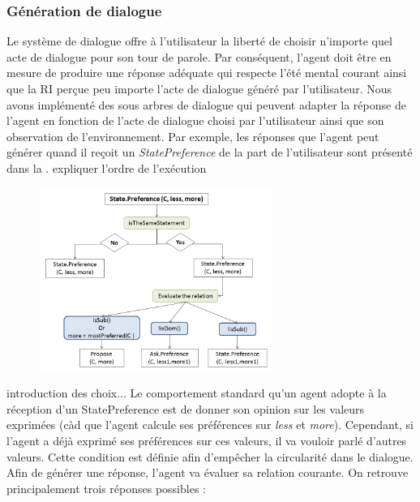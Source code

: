 \documentclass [french]{sig-alternate-05-2015}
\begin{document}
\subsubsection{Génération de dialogue} 
 \par Le système de dialogue offre à l'utilisateur la liberté de choisir n'importe quel acte de dialogue pour son tour de parole. Par conséquent, l'agent doit être en mesure de produire une réponse adéquate qui respecte l'été mental courant ainsi que la RI perçue peu importe l'acte de dialogue généré par l'utilisateur. Nous avons implémenté des sous arbres de dialogue qui peuvent adapter la réponse de l'agent en fonction de  l'acte de dialogue choisi par l'utilisateur ainsi que son observation de l'environnement. Par exemple, les réponses que l'agent peut générer quand il reçoit un \emph{StatePreference} de la part de l'utilisateur sont présenté dans la .
 {\color{red} expliquer l'ordre de l'exécution}
 \begin{figure} [h]
 	\centerline{\includegraphics[width=3in]{figs/statePref_v2.png}}
	\vskip 8pt
 \end{figure}
\par {\color{red} introduction des choix...} 
Le comportement standard qu'un agent adopte à la réception d'un StatePreference est de donner son opinion sur les valeurs exprimées (càd que l'agent calcule ses préférences sur \textit{less} et \textit{more}). Cependant, si l'agent a déjà exprimé ses préférences sur ces valeurs, il va vouloir parlé d'autres valeurs. Cette condition est définie afin d'empêcher la circularité dans le dialogue.  
Afin de générer une réponse, l'agent va évaluer sa relation courante. On retrouve principalement trois réponses possibles : 
\end{document}

